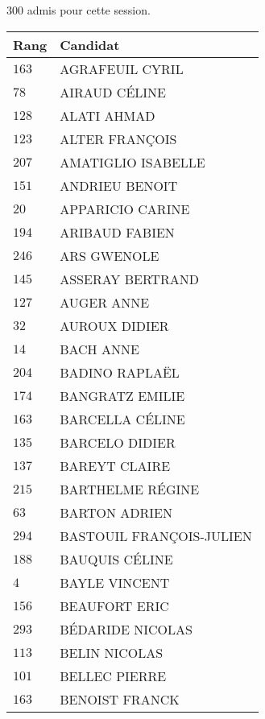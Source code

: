 




  $300$ admis pour cette session.

  \begin{xltabular}{\linewidth}{|l|X|}
    \hline
    \textbf{Rang} & \textbf{Candidat} \\
    \hline
    $163$ & AGRAFEUIL CYRIL \\
    \hline
    $78$ & AIRAUD CÉLINE \\
    \hline
    $128$ & ALATI AHMAD \\
    \hline
    $123$ & ALTER FRANÇOIS \\
    \hline
    $207$ & AMATIGLIO ISABELLE \\
    \hline
    $151$ & ANDRIEU BENOIT \\
    \hline
    $20$ & APPARICIO CARINE \\
    \hline
    $194$ & ARIBAUD FABIEN \\
    \hline
    $246$ & ARS GWENOLE \\
    \hline
    $145$ & ASSERAY BERTRAND \\
    \hline
    $127$ & AUGER ANNE \\
    \hline
    $32$ & AUROUX DIDIER \\
    \hline
    $14$ & BACH ANNE \\
    \hline
    $204$ & BADINO RAPLAËL \\
    \hline
    $174$ & BANGRATZ EMILIE \\
    \hline
    $163$ & BARCELLA CÉLINE \\
    \hline
    $135$ & BARCELO DIDIER \\
    \hline
    $137$ & BAREYT CLAIRE \\
    \hline
    $215$ & BARTHELME RÉGINE \\
    \hline
    $63$ & BARTON ADRIEN \\
    \hline
    $294$ & BASTOUIL FRANÇOIS-JULIEN \\
    \hline
    $188$ & BAUQUIS CÉLINE \\
    \hline
    $4$ & BAYLE VINCENT \\
    \hline
    $156$ & BEAUFORT ERIC \\
    \hline
    $293$ & BÉDARIDE NICOLAS \\
    \hline
    $113$ & BELIN NICOLAS \\
    \hline
    $101$ & BELLEC PIERRE \\
    \hline
    $163$ & BENOIST FRANCK \\

\end{xltabular}
